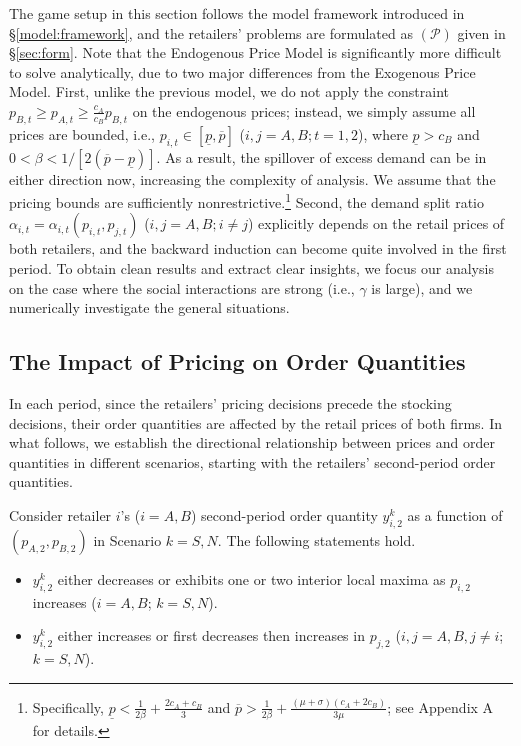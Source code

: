 \documentclass[nonblindrev,copyedit]{informs1}
\begin{document}
The game setup in this section follows the model framework introduced in \S\ref{model:framework}, and the retailers' problems are formulated as $(\mathcal{P})$ given in \S\ref{sec:form}. Note that the Endogenous Price Model is significantly more difficult to solve analytically, due to two major differences from the Exogenous Price Model. First, unlike the previous model, we do not apply the constraint $p_{B,t} \geq p_{A,t} \geq \frac{c_A}{c_B} p_{B,t}$ on the endogenous prices; instead, we simply assume all prices are bounded, i.e., $p_{i,t} \in [\underline{p}, \overline{p}]$ ($i, j = A, B; t = 1,2$), where $\underline{p} >c_B$ and $0<\beta<1/[2(\overline{p}-\underline{p})]$. As a result, the spillover of excess demand can be in either direction now, increasing the complexity of analysis. We assume that the pricing bounds are sufficiently nonrestrictive.\footnote{Specifically, $\underline{p}<\frac{1}{2\beta}+\frac{2c_A+c_B}{3}$ and $\overline{p}>\frac{1}{2\beta}+\frac{(\mu+\sigma)(c_A+2c_B)}{3\mu}$; see Appendix A for details.}
Second, the demand split ratio $\alpha_{i,t} = \alpha_{i,t}(p_{i,t}, p_{j,t})$ ($i, j = A, B; i \neq j$) explicitly depends on the retail prices of both retailers, and the backward induction can become quite involved in the first period.
To obtain clean results and extract clear insights, we focus our analysis on the case where the social interactions are strong (i.e., $\gamma$ is large), and we numerically investigate the general situations.

\subsection{The Impact of Pricing on Order Quantities}

In each period, since the retailers' pricing decisions precede the stocking decisions, their order quantities are affected by the retail prices of both firms. In what follows, we establish the directional relationship between prices and order quantities in different scenarios, starting with the retailers' second-period order quantities.

\begin{proposition}\label{prop:orderprice2}
    Consider retailer $i$'s ($i=A,B$) second-period order quantity $y_{i,2}^k$ as a function of $(p_{A,2}, p_{B,2})$ in Scenario $k=S,N$. The following statements hold.
    \begin{itemize}
        \item [(a)] $y^k_{i,2}$ either decreases or exhibits one or two interior local maxima as $p_{i,2}$ increases ($i=A,B$; $k=S,N$).
        \item [(b)] $y^k_{i,2}$ either increases or first decreases then increases in $p_{j,2}$ ($i,j=A,B, j \neq i$; $k=S,N$).
    \end{itemize}
\end{proposition}
\end{document}
